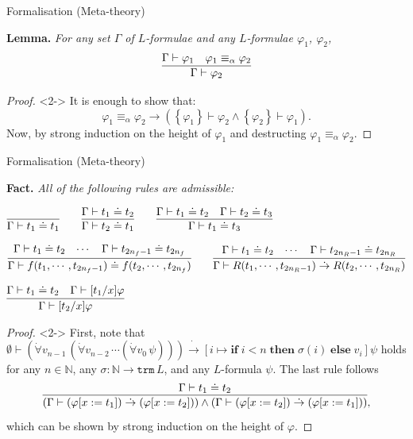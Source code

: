 \documentclass[serif,table,10pt]{beamer}
\newcommand{\IN}{\mathbb{N}}
\newcommand{\0}{\texttt{0}}
\newcommand{\1}{\texttt{1}}
\newcommand{\Leq}{\mathrel{\dot{=}}}
\newcommand{\Lto}{\mathrel{\dot{\to}}}
\newcommand{\Lall}[1]{\dot{\forall}#1\,}
\begin{document}
\begin{frame}{Formalisation (Meta-theory)}

    \textbf{Lemma.}
    \emph{For any set $\Gamma$ of $L$-formulae and any $L$-formulae $\varphi_1$, $\varphi_2$, $$ \infer{\Gamma \vdash \varphi_2}{\Gamma \vdash \varphi_1 & \varphi_1 \equiv_\alpha \varphi_2} $$}

    \begin{proof}<2->
        It is enough to show that: $$ \varphi_1 \equiv_\alpha \varphi_2 \to ( \left\{ \varphi_1 \right\} \vdash \varphi_2 \land \left\{ \varphi_2 \right\} \vdash \varphi_1 ) . $$
        Now, by strong induction on the height of $\varphi_1$ and destructing $ \varphi_1 \equiv_\alpha \varphi_2 $.
    \end{proof}

\end{frame}

\begin{frame}{Formalisation (Meta-theory)}

    \textbf{Fact.}
    \emph{All of the following rules are admissible:}

    \begin{center} \small
        $ \infer{\Gamma \vdash t_1 \Leq t_1}{} \qquad \infer{\Gamma \vdash t_2 \Leq t_1}{\Gamma \vdash t_1 \Leq t_2} \qquad \infer{\Gamma \vdash t_1 \Leq t_3}{\Gamma \vdash t_1 \Leq t_2 & \Gamma \vdash t_2 \Leq t_3} $
    \end{center}
    \begin{center} \small
        $ \infer{\Gamma \vdash f (t_1, \cdots , t_{2 n_f - 1}) \Leq f (t_2 , \cdots , t_{2 n_f})}{\Gamma \vdash t_1 \Leq t_2 & \cdots & \Gamma \vdash t_{2 n_f - 1} \Leq t_{2 n_f}} \qquad \infer{\Gamma \vdash R (t_1, \cdots , t_{2 n_R - 1}) \Lto R (t_2 , \cdots , t_{2 n_R})}{\Gamma \vdash t_1 \Leq t_2 & \cdots & \Gamma \vdash t_{2 n_R - 1} \Leq t_{2 n_R}} $
    \end{center}
    \begin{center} \small
        $ \infer{\Gamma \vdash [t_2 / x] \varphi}{\Gamma \vdash t_1 \Leq t_2 & \Gamma \vdash [t_1 / x] \varphi} $
    \end{center}

    \begin{proof}<2-> \small
        First, note that $ \emptyset \vdash ( \Lall{v_{n-1}} ( \Lall{v_{n-2}} \cdots ( \Lall{v_0} \psi ) ) ) \Lto [ i \mapsto \mathbf{if} \; i < n \; \mathbf{then} \; \sigma ( i ) \; \mathbf{else} \; v_i ] \psi $ holds for any $n \in \IN$, any $\sigma : \IN \to \mathtt{trm} \, L$, and any $L$-formula $\psi$.
        The last rule follows \[ \infer{(\Gamma \vdash (\varphi [ x := t_1 ]) \Lto (\varphi [ x := t_2 ]) ) \land ( \Gamma \vdash (\varphi [ x := t_2 ]) \Lto (\varphi [ x := t_1 ]) )}{\Gamma \vdash t_1 \Leq t_2} , \] which can be shown by strong induction on the height of $\varphi$.
    \end{proof}

\end{frame}
\end{document}
